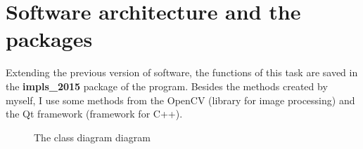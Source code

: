 \section{Software architecture and the packages}
Extending the previous version of software, the functions of this task are saved in the \textbf{impls\_2015} package of the program. Besides the methods created by myself, I use some methods from the OpenCV (library for image processing) and the Qt framework (framework for C++).\\[0.2cm]
\begin{figure}[p]
    \vspace*{-3cm}
    \caption{The class diagram diagram}
    \label{fig:cdiagram}
\end{figure}
